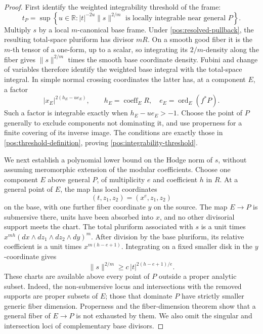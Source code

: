 \documentclass[11pt,letterpaper]{article}
\newcommand{\R}{\mathbb{R}}
\DeclareMathOperator{\ord}{ord}
\theoremstyle{definition}
\theoremstyle{remark}
\begin{document}
\begin{proof}
First identify the weighted integrability threshold of the frame:
\begin{equation}\label{pos:integrability-threshold}
 t_P=\sup\left\{u\in\R:
 |t|^{-2u}\|s\|^{2/m}\text{ is locally integrable near general }P
 \right\}.
\end{equation}
Multiply \(s\) by a local \(m\)-canonical base frame. Under
\eqref{pos:resolved-pullback}, the resulting total-space
pluriform has divisor \(mR\). On a smooth good fiber it is the
\(m\)-th tensor of a one-form, up to a scalar, so integrating its
\(2/m\)-density along the fiber gives \(\|s\|^{2/m}\) times the
smooth base coordinate density. Fubini and change of variables
therefore identify the weighted base integral with the total-space
integral. In simple normal crossing coordinates the latter has, at
a component \(E\), a factor
\[
 |x_E|^{2(h_E-u e_E)},\qquad
 h_E=\operatorname{coeff}_E R,\quad e_E=\ord_E(f^*P).
\]
Such a factor is integrable exactly when \(h_E-u e_E>-1\).
Choose the point of \(P\) generally to exclude components not
dominating it, and use properness for a finite covering of its inverse
image. The conditions are exactly those in
\eqref{pos:threshold-definition}, proving
\eqref{pos:integrability-threshold}.

We next establish a polynomial lower bound on the Hodge norm of
\(s\), without assuming meromorphic extension of the modular
coefficients. Choose one component \(E\) above general \(P\), of
multiplicity \(e\) and coefficient \(h\) in \(R\). At a general
point of \(E\), the map has local coordinates
\[
 (t,z_1,z_2)=(x^e,z_1,z_2)
\]
on the base, with one further fiber coordinate \(y\) on the source.
The map \(E\to P\) is submersive there, units have been absorbed
into \(x\), and no other divisorial support meets the chart. The
total pluriform associated with \(s\) is a unit times
\(x^{mh}(dx\wedge dz_1\wedge dz_2\wedge dy)^m\).
After division by the base pluriform, its relative coefficient is
a unit times \(x^{m(h-e+1)}\). Integrating on a fixed smaller disk
in the \(y\)-coordinate gives
\begin{equation}\label{pos:polynomial-lower-bound}
 \|s\|^{2/m}\geq c\,|t|^{2(h-e+1)/e}.
\end{equation}
These charts are available above every point of \(P\) outside a
proper analytic subset. Indeed, the non-submersive locus and
intersections with the removed supports are proper subsets of \(E\);
those that dominate \(P\) have strictly smaller generic fiber
dimension. Properness and the fiber-dimension theorem show that a
general fiber of \(E\to P\) is not exhausted by them. We also omit
the singular and intersection loci of complementary base divisors.


\end{proof}
\end{document}
